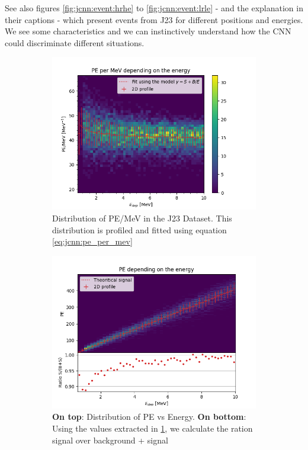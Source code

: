 \documentclass[../main.tex]{subfiles}
\begin{document}
See also figures \ref{fig:jcnn:event:hrhe} to \ref{fig:jcnn:event:lrle} - and the explanation in their captions -  which present events from J23 for different positions and energies. We see some characteristics and we can instinctively understand how the CNN could discriminate different situations.

\begin{figure}[ht]
  \begin{subfigure}[t]{0.48\linewidth}
    \centering
    \includegraphics[width=\textwidth]{images/jcnn/pe_mev.png}
    \caption{Distribution of PE/MeV in the J23 Dataset. This distribution is profiled and fitted using equation \ref{eq:jcnn:pe_per_mev}}
    \label{fig:jcnn:pe_per_mev}
  \end{subfigure}
  \hfill
  \begin{subfigure}[t]{0.48\linewidth}
    \centering
    \includegraphics[width=\textwidth]{images/jcnn/pe_vs_mev.png}
    \caption{\textbf{On top}: Distribution of PE vs Energy. \textbf{On bottom}: Using the values extracted in \ref{fig:jcnn:pe_per_mev}, we calculate the ration signal over background + signal}
    \label{fig:jcnn:pe_vs_mev}
  \end{subfigure}
  \caption{}
\end{figure}
\end{document}
